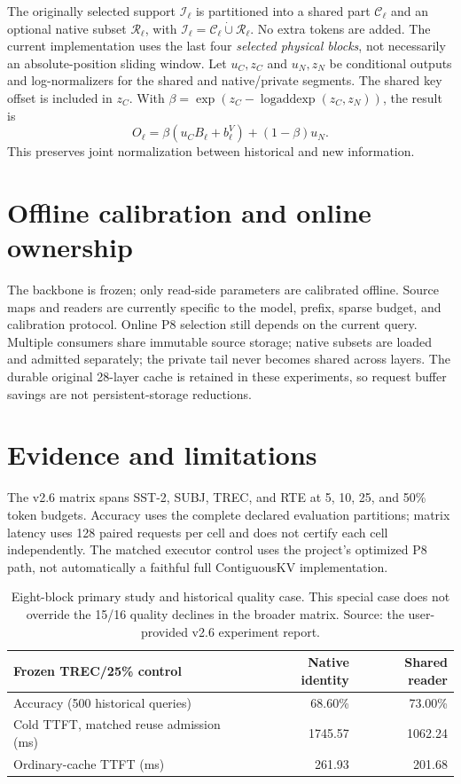 \documentclass[10pt]{article}
\begin{document}
The originally selected support $\mathcal I_\ell$ is partitioned into a shared
part $\mathcal C_\ell$ and an optional native subset $\mathcal R_\ell$, with
$\mathcal I_\ell=\mathcal C_\ell\dot\cup\mathcal R_\ell$. No extra tokens are
added. The current implementation uses the last four \emph{selected physical
blocks}, not necessarily an absolute-position sliding window.
Let $u_C,z_C$ and $u_N,z_N$ be conditional outputs and log-normalizers for the
shared and native/private segments. The shared key offset is included in $z_C$.
With $\beta=\exp(z_C-\operatorname{logaddexp}(z_C,z_N))$, the result is
\begin{equation}
 O_\ell=\beta(u_CB_\ell+b^V_\ell)+(1-\beta)u_N.
\end{equation}
This preserves joint normalization between historical and new information.

\section{Offline calibration and online ownership}
The backbone is frozen; only read-side parameters are calibrated offline.
Source maps and readers are currently specific to the model, prefix, sparse
budget, and calibration protocol. Online P8 selection still depends on the current
query. Multiple consumers share immutable source storage; native subsets are loaded
and admitted separately; the private tail never becomes shared across layers.
The durable original 28-layer cache is retained in these experiments, so request
buffer savings are not persistent-storage reductions.

\section{Evidence and limitations}
The v2.6 matrix spans SST-2, SUBJ, TREC, and RTE at 5, 10, 25, and 50\% token
budgets. Accuracy uses the complete declared evaluation partitions; matrix latency
uses 128 paired requests per cell and does not certify each cell independently.
The matched executor control uses the project's optimized P8 path, not automatically
a faithful full ContiguousKV implementation.

\begin{table}[h]
\centering
\begin{tabular}{lrr}
\toprule
Frozen TREC/25\% control & Native identity & Shared reader\\
\midrule
Accuracy (500 historical queries) & 68.60\% & 73.00\%\\
Cold TTFT, matched reuse admission (ms) & 1745.57 & 1062.24\\
Ordinary-cache TTFT (ms) & 261.93 & 201.68\\
\bottomrule
\end{tabular}
\caption{Eight-block primary study and historical quality case. This special case
does not override the 15/16 quality declines in the broader matrix. Source: the
user-provided v2.6 experiment report.}
\end{table}
\end{document}
